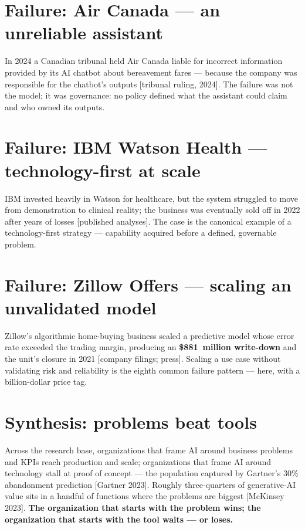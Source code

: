 \section{Failure: Air Canada — an unreliable assistant}

In 2024 a Canadian tribunal held Air Canada liable for incorrect information
provided by its AI chatbot about bereavement fares — because the company was
responsible for the chatbot's outputs [tribunal ruling, 2024]. The failure was
not the model; it was governance: no policy defined what the assistant could
claim and who owned its outputs.

\section{Failure: IBM Watson Health — technology-first at scale}

IBM invested heavily in Watson for healthcare, but the system struggled to
move from demonstration to clinical reality; the business was eventually sold
off in 2022 after years of losses [published analyses]. The case is the
canonical example of a technology-first strategy — capability acquired before
a defined, governable problem.

\section{Failure: Zillow Offers — scaling an unvalidated model}

Zillow's algorithmic home-buying business scaled a predictive model whose
error rate exceeded the trading margin, producing an \textbf{\$881~million
write-down} and the unit's closure in 2021 [company filings; press]. Scaling a
use case without validating risk and reliability is the eighth common failure
pattern — here, with a billion-dollar price tag.

\section{Synthesis: problems beat tools}

Across the research base, organizations that frame AI around business problems
and KPIs reach production and scale; organizations that frame AI around
technology stall at proof of concept — the population captured by Gartner's
30\% abandonment prediction [Gartner 2023]. Roughly three-quarters of
generative-AI value sits in a handful of functions where the problems are
biggest [McKinsey 2023]. \textbf{The organization that starts with the problem
wins; the organization that starts with the tool waits — or loses.}

